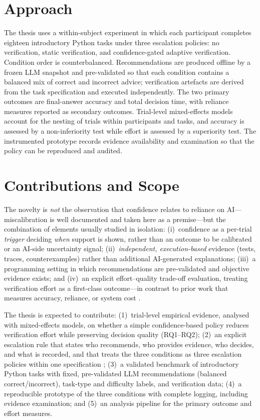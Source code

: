 \documentclass[oneside,final,14pt,a4paper]{extreport}
\begin{document}
\section{Approach}
\label{sec:approach}

The thesis uses a within-subject experiment in which each participant completes
eighteen introductory Python tasks under three escalation policies: no
verification, static verification, and confidence-gated adaptive verification.
Condition order is counterbalanced. Recommendations are produced offline by a
frozen LLM snapshot and pre-validated so that each condition contains a balanced
mix of correct and incorrect advice; verification artefacts are derived from the
task specification and executed independently. The two primary outcomes are
final-answer accuracy and total decision time, with reliance measures reported
as secondary outcomes. Trial-level mixed-effects models account for the nesting
of trials within participants and tasks, and accuracy is assessed by a
non-inferiority test while effort is assessed by a superiority test. The
instrumented prototype records evidence availability and examination so that the
policy can be reproduced and audited.

\section{Contributions and Scope}
\label{sec:contributions}

The novelty is \emph{not} the observation that confidence relates to reliance on
AI---miscalibration is well documented \cite{KrugerDunning1999,Bo2025} and taken
here as a premise---but the combination of elements usually studied in
isolation: (i)~confidence as a per-trial \emph{trigger} deciding \emph{when}
support is shown, rather than an outcome to be calibrated or an AI-side
uncertainty signal; (ii)~\emph{independent, execution-based} evidence (tests,
traces, counterexamples) rather than additional AI-generated explanations;
(iii)~a programming setting in which recommendations are pre-validated and
objective evidence exists; and (iv)~an explicit effort--quality trade-off
evaluation, treating verification effort as a first-class outcome---in contrast
to prior work that measures accuracy, reliance, or system cost
\cite{CascadedLM2025,Zhang2024Verify}.

The thesis is expected to contribute: (1)~trial-level empirical evidence,
analysed with mixed-effects models, on whether a simple confidence-based policy
reduces verification effort while preserving decision quality (RQ1--RQ2);
(2)~an explicit escalation rule that states who recommends, who provides
evidence, who decides, and what is recorded, and that treats the three
conditions as three escalation policies within one specification
\cite{Ciancarini2027}; (3)~a validated benchmark of introductory Python tasks
with fixed, pre-validated LLM recommendations (balanced correct/incorrect),
task-type and difficulty labels, and verification data; (4)~a reproducible
prototype of the three conditions with complete logging, including evidence
examination; and (5)~an analysis pipeline for the primary outcome and effort
measures.
\end{document}
